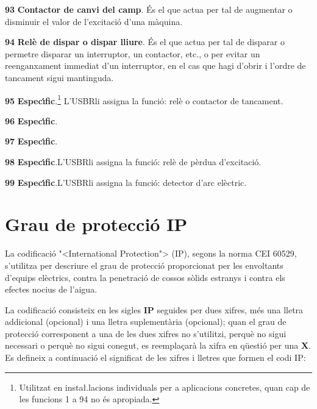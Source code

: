 \begin{multicols}{2}
\begin{list}{}
\item[\textbf{93}]  \textbf{Contactor de canvi del camp}. \'{E}s el
que actua per tal de augmentar o disminuir el valor de l'excitaci\'{o}
d'una m\`{a}quina.

\item[\textbf{94}]  \textbf{Rel\`{e} de dispar o dispar
lliure}. \'{E}s el que actua per tal de disparar o permetre disparar un
interruptor, un contactor, etc., o per evitar un reenganxament
immediat d'un interruptor, en el cas que hagi d'obrir i l'ordre de
tancament sigui mantinguda.

\item[\textbf{95}] \textbf{Espec\'{\i}fic}.\footnote{Utilitzat en insta{\l.l}acions
individuals per a aplicacions concretes, quan cap de les funcions 1
a 94 no \'{e}s apropiada.} L'\textsf{USBR}\footnotemark[1] li assigna la
funci\'{o}: rel\`{e} o contactor de tancament.

\item[\textbf{96}] \textbf{Espec\'{\i}fic}.\footnotemark[2]

\item[\textbf{97}] \textbf{Espec\'{\i}fic}.\footnotemark[2]


\item[\textbf{98}] \textbf{Espec\'{\i}fic}.\footnotemark[2] L'\textsf{USBR}\footnotemark[1] li assigna la
funci\'{o}: rel\`{e} de p\`{e}rdua d'excitaci\'{o}.

\item[\textbf{99}] \textbf{Espec\'{\i}fic}.\footnotemark[2] L'\textsf{USBR}\footnotemark[1] li assigna la
funci\'{o}: detector d'arc el\`{e}ctric.

\end{list}
\end{multicols}


\section{Grau de protecci\'{o} IP}   

La codificaci\'{o} {"<}International Protection{">} (\textsf{IP}), segons la
norma \textsf{CEI 60529}, s'utilitza per descriure el grau de
protecci\'{o}  proporcionat per les envoltants d'equips el\`{e}ctrics, contra
la penetraci\'{o} de cossos s\`{o}lids estranys i contra els efectes nocius
de l'aigua.

La codificaci\'{o} consisteix en les sigles \textsf{\textbf{IP}}
seguides per dues xifres, m\'{e}s una lletra addicional (opcional) i una
lletra suplement\`{a}ria (opcional); quan el grau de protecci\'{o}
corresponent a una de les dues xifres no s'utilitzi, perqu\`{e} no sigui
necessari o perqu\`{e} no sigui conegut, es reempla\c{c}ar\`{a} la xifra en
q\"{u}esti\'{o} per una \textsf{\textbf{X}}. Es defineix a continuaci\'{o} el
significat de les xifres i lletres que formen el codi \textsf{IP}:

